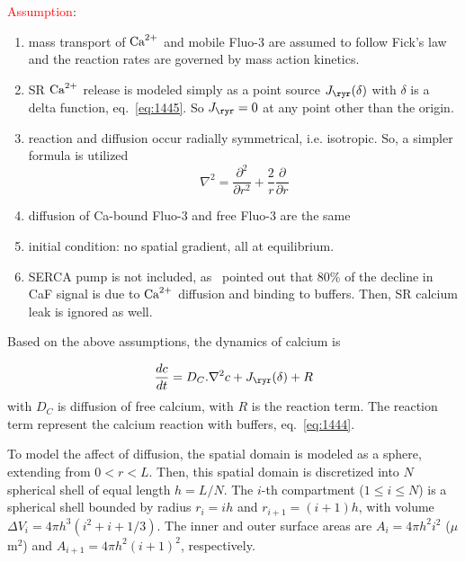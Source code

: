 \textcolor{red}{Assumption}: 
\begin{enumerate}
\item mass transport of ${\text{Ca}^{2+}}$ and mobile Fluo-3 are assumed to follow
  Fick's law and the reaction rates are governed by mass action
  kinetics.
\item SR ${\text{Ca}^{2+}}$ release is modeled simply as a point source
  $J_\ryr(\delta)$ with $\delta$ is a delta function,
  eq.~\eqref{eq:1445}. So $J_\ryr=0$ at any point other than the
  origin.

\item reaction and diffusion occur radially symmetrical,
  i.e. isotropic. So, a simpler formula is utilized
  \begin{equation}
    \label{eq:1442}
    \nabla^2 = \frac{\partial^2}{\partial r^2} +
    \frac{2}{r}\frac{\partial}{\partial r}
  \end{equation}
\item diffusion of Ca-bound Fluo-3 and free Fluo-3 are the same

\item initial condition: no spatial gradient, all at equilibrium.

\item SERCA pump is not included, as~\citep{gomez1996} pointed out
  that 80\% of the decline in CaF signal is due to ${\text{Ca}^{2+}}$ diffusion and
  binding to buffers. Then, SR calcium leak is ignored as well. 
\end{enumerate}

Based on the above assumptions, the dynamics of calcium is

\begin{equation}
  \label{eq:1449}
  \frac{dc}{dt} = D_C.\nabla^2c + J_\ryr(\delta) +
  R
\end{equation}
with $D_C$ is diffusion of free calcium, with $R$ is the reaction
term. The reaction term represent the calcium reaction with buffers,
eq.~\eqref{eq:1444}.

To model the affect of diffusion, the spatial domain is modeled as a
sphere, extending from $0<r<L$. Then, this spatial domain is
discretized into $N$ spherical shell of equal length $h=L/N$.  The
$i$-th compartment ($1\le i\le N$) is a spherical shell bounded by
radius $r_i=ih$ and $r_{i+1}=(i+1)h$, with volume $\Delta V_i=4\pi
h^3(i^2+i+1/3)$.  The inner and outer surface areas are $A_i=4\pi h^2
i^2$ ($\mu$m$^2$) and $A_{i+1}=4\pi h^2(i+1)^2$, respectively.

